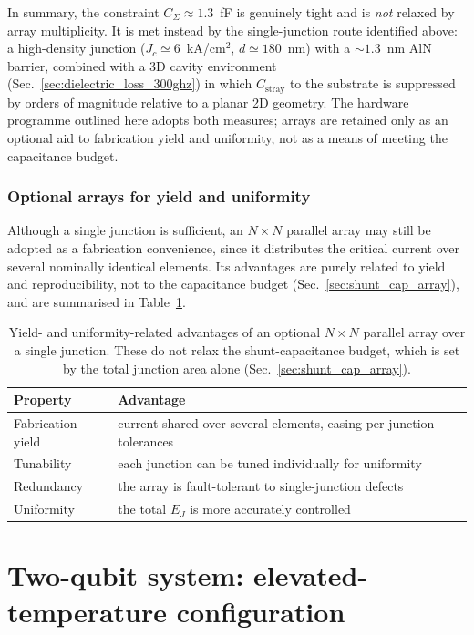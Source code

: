 In summary, the constraint $C_{\Sigma}\approx 1.3$~fF is genuinely tight and is
\emph{not} relaxed by array multiplicity. It is met instead by the
single-junction route identified above: a high-density junction
($J_c\simeq 6$~kA/cm$^2$, $d\simeq 180$~nm) with a $\sim 1.3$~nm AlN barrier,
combined with a 3D cavity environment (Sec.~\ref{sec:dielectric_loss_300ghz})
in which $C_{\text{stray}}$ to the substrate is suppressed by orders of
magnitude relative to a planar 2D geometry. The hardware programme outlined
here adopts both measures; arrays are retained only as an optional aid to
fabrication yield and uniformity, not as a means of meeting the capacitance
budget.

\subsubsection{Optional arrays for yield and uniformity}

Although a single junction is sufficient, an $N\times N$ parallel array may
still be adopted as a fabrication convenience, since it distributes the
critical current over several nominally identical elements. Its advantages are
purely related to yield and reproducibility, not to the capacitance budget
(Sec.~\ref{sec:shunt_cap_array}), and are summarised in
Table~\ref{tab:array_advantages}.

\begin{table}[h]
\centering
\begin{tabular}{@{}lp{}@{}}
\toprule
\textbf{Property} & \textbf{Advantage} \\
\midrule
Fabrication yield & current shared over several elements, easing per-junction tolerances \\
Tunability        & each junction can be tuned individually for uniformity \\
Redundancy        & the array is fault-tolerant to single-junction defects \\
Uniformity        & the total $E_J$ is more accurately controlled \\
\bottomrule
\end{tabular}
\caption{Yield- and uniformity-related advantages of an optional $N \times N$ parallel array over a single junction. These do not relax the shunt-capacitance budget, which is set by the total junction area alone (Sec.~\ref{sec:shunt_cap_array}).}
\label{tab:array_advantages}
\end{table}

\section{Two-qubit system: elevated-temperature configuration}
\label{sec:two_qubit_innovation}

